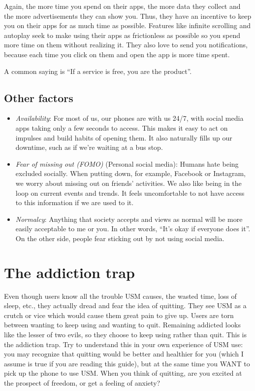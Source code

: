 \documentclass[
  openany]{book}
\providecommand{\tightlist}{%
  \setlength{\itemsep}{0pt}\setlength{\parskip}{0pt}}
\newenvironment{rmdcaution}{
\color{red}
\begin{framed}}{\end{framed}}
\begin{document}
Again, the more time you spend on their apps, the more data they collect and the more advertisements they can show you. Thus, they have an incentive to keep you on their apps for as much time as possible. Features like infinite scrolling and autoplay seek to make using their apps as frictionless as possible so you spend more time on them without realizing it. They also love to send you notifications, because each time you click on them and open the app is more time spent.

\begin{rmdcaution}
A common saying is ``If a service is free, you are the product''.

\end{rmdcaution}

\section{Other factors}\label{other-factors}

\begin{itemize}
\tightlist
\item
  \emph{Availability}: For most of us, our phones are with us 24/7, with social media apps taking only a few seconds to access. This makes it easy to act on impulses and build habits of opening them. It also naturally fills up our downtime, such as if we're waiting at a bus stop.
\item
  \emph{Fear of missing out (FOMO)} (Personal social media): Humans hate being excluded socially. When putting down, for example, Facebook or Instagram, we worry about missing out on friends' activities. We also like being in the loop on current events and trends. It feels uncomfortable to not have access to this information if we are used to it.
\item
  \emph{Normalcy}: Anything that society accepts and views as normal will be more easily acceptable to me or you. In other words, ``It's okay if everyone does it''. On the other side, people fear sticking out by not using social media.
\end{itemize}

\chapter{The addiction trap}\label{the-trap}

Even though users know all the trouble USM causes, the wasted time, loss of sleep, etc., they actually dread and fear the idea of quitting. They see USM as a crutch or vice which would cause them great pain to give up. Users are torn between wanting to keep using and wanting to quit. Remaining addicted looks like the lesser of two evils, so they choose to keep using rather than quit. This is the addiction trap. Try to understand this in your own experience of USM use: you may recognize that quitting would be better and healthier for you (which I assume is true if you are reading this guide), but at the same time you WANT to pick up the phone to use USM. When you think of quitting, are you excited at the prospect of freedom, or get a feeling of anxiety?
\end{document}
